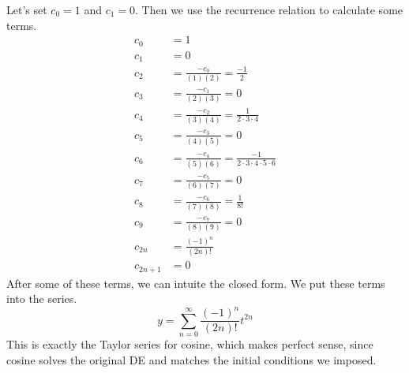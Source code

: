 \documentclass[fleqn,letterpaper]{report}
\begin{document}
\begin{example}
Let's set $c_0 = 1$ and $c_1 = 0$. Then we use the recurrence
relation to calculate some terms.
\begin{align*}
c_0 & = 1 \\
c_1 & = 0 \\
c_2 & = \frac{-c_0}{(1)(2)} = \frac{-1}{2}\\
c_3 & = \frac{-c_1}{(2)(3)} = 0 \\
c_4 & = \frac{-c_2}{(3)(4)} = \frac{1}{2\cdot 3 \cdot 4}\\
c_5 & = \frac{-c_3}{(4)(5)} = 0 \\
c_6 & = \frac{-c_4}{(5)(6)} = \frac{-1}{2\cdot 3 \cdot 4 \cdot 5
\cdot 6 }\\
c_7 & = \frac{-c_5}{(6)(7)} = 0 \\
c_8 & = \frac{-c_6}{(7)(8)} = \frac{1}{8!}\\
c_9 & = \frac{-c_7}{(8)(9)} = 0 \\
c_{2n} & = \frac{(-1)^n}{(2n)!} \\
c_{2n+1} & = 0 
\end{align*}
After some of these terms, we can intuite the closed form. We
put these terms into the series.
\begin{equation*}
y = \sum_{n=0}^\infty \frac{(-1)^n}{(2n)!} t^{2n}
\end{equation*}
This is exactly the Taylor series for cosine, which makes
perfect sense, since cosine solves the original DE and matches
the initial conditions we imposed.
\end{example}
\end{document}
